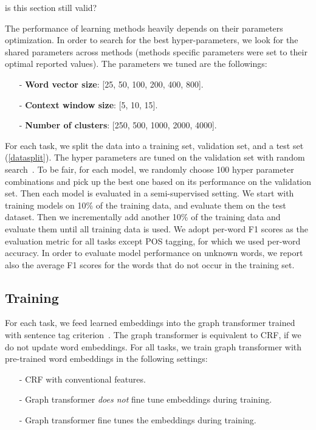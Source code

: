 {\color{red} is this section still valid?}

The performance of learning methods heavily depends on their parameters optimization. 
In order to search for the best hyper-parameters, we look for the shared parameters across methods (methods specific parameters were set to their optimal reported values). The parameters we tuned are the followings:

\begin{small}
\begin{itemize}
\item[-]\textbf{Word vector size}: [25, 50, 100, 200, 400, 800].
\item[-]\textbf{Context window size}: [5, 10, 15].
\item[-]\textbf{Number of clusters}: [250, 500, 1000, 2000, 4000]. 
\end{itemize}
\end{small}

For each task, we split the data into a training set, validation set, and a test set (\ref{datasplit}). The hyper parameters are tuned on the validation set with random search~\cite{bergstra2012random}. To be fair, for each model, we randomly choose 100 hyper parameter combinations and pick up the best one based on its performance on the validation set. Then each model is evaluated in a semi-supervised setting. We start with training models on 10\% of the training data, and evaluate them on the test dataset. Then we incrementally add another 10\% of the training data and evaluate them until all training data is used. We adopt per-word F1 scores as the evaluation metric for all tasks except POS tagging, for which we used per-word accuracy.
In order to evaluate model performance on unknown words, we report also the average F1 scores for the words that do not occur in the training set.


\subsection{Training}
For each task, we feed learned embeddings into the graph transformer trained with sentence tag criterion~\cite{turian2010word}. The graph transformer is equivalent to CRF, if we do not update word embeddings. For all tasks, we train graph transformer with pre-trained word embeddings in the following settings: 

\begin{small}
\begin{itemize}
\item[-] CRF with conventional features.
\item[-] Graph transformer \textit{does not} fine tune embeddings during training.
\item[-] Graph transformer fine tunes the embeddings during training.
\end{itemize}
\end{small}

